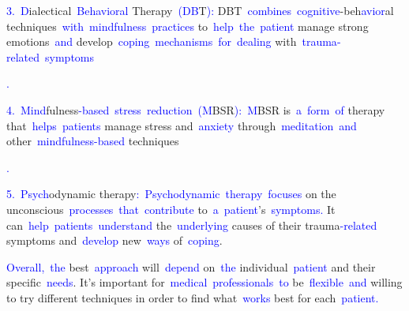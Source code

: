 \documentclass{article}
\begin{document}
\begin{tcolorbox}[colframe=black,colback=white]
\textcolor{blue}{3}\textcolor{blue}{.}\textcolor{blue}{~D}ialectical\textcolor{blue}{~Behavioral} Therapy\textcolor{blue}{~(}\textcolor{blue}{DB}T\textcolor{blue}{):} DBT\textcolor{blue}{~combines}\textcolor{blue}{~cognitive}-beh\textcolor{blue}{avior}al techniques\textcolor{blue}{~with}\textcolor{blue}{~mindfulness}\textcolor{blue}{~practices} to\textcolor{blue}{~help}\textcolor{blue}{~the}\textcolor{blue}{~patient} manage strong emotions\textcolor{blue}{~and} develop\textcolor{blue}{~coping}\textcolor{blue}{~mechanisms}\textcolor{blue}{~for}\textcolor{blue}{~dealing} with\textcolor{blue}{~trauma}\textcolor{blue}{-related}\textcolor{blue}{~symptoms}\textcolor{blue}{.

}\textcolor{blue}{4}\textcolor{blue}{.}\textcolor{blue}{~Mind}fulness\textcolor{blue}{-based}\textcolor{blue}{~stress}\textcolor{blue}{~reduction}\textcolor{blue}{~(}\textcolor{blue}{M}BSR\textcolor{blue}{):}\textcolor{blue}{~M}BSR is\textcolor{blue}{~a}\textcolor{blue}{~form}\textcolor{blue}{~of} therapy that\textcolor{blue}{~helps}\textcolor{blue}{~patients} manage stress and\textcolor{blue}{~anxiety} through\textcolor{blue}{~meditation}\textcolor{blue}{~and} other\textcolor{blue}{~mindfulness}\textcolor{blue}{-based} techniques\textcolor{blue}{.

}\textcolor{blue}{5}\textcolor{blue}{.}\textcolor{blue}{~Psych}odynamic therapy\textcolor{blue}{:}\textcolor{blue}{~Psych}\textcolor{blue}{odynamic}\textcolor{blue}{~therapy}\textcolor{blue}{~focuses} on the unconscious\textcolor{blue}{~processes}\textcolor{blue}{~that}\textcolor{blue}{~contribute} to\textcolor{blue}{~a}\textcolor{blue}{~patient}'s\textcolor{blue}{~symptoms}\textcolor{blue}{.} It can\textcolor{blue}{~help}\textcolor{blue}{~patients}\textcolor{blue}{~understand} the\textcolor{blue}{~underlying} causes of their trauma\textcolor{blue}{-related} symptoms and\textcolor{blue}{~develop} new\textcolor{blue}{~ways} of\textcolor{blue}{~coping}.

\textcolor{blue}{Overall}\textcolor{blue}{,}\textcolor{blue}{~the} best\textcolor{blue}{~approach} will\textcolor{blue}{~depend} on\textcolor{blue}{~the} individual\textcolor{blue}{~patient} and their specific\textcolor{blue}{~needs}. It's important for\textcolor{blue}{~medical}\textcolor{blue}{~professionals}\textcolor{blue}{~to} be\textcolor{blue}{~flexible}\textcolor{blue}{~and} willing to try different techniques in order to find what\textcolor{blue}{~works} best for each\textcolor{blue}{~patient}\textcolor{blue}{.}\textcolor{blue}{}
\end{tcolorbox}
\end{document}
